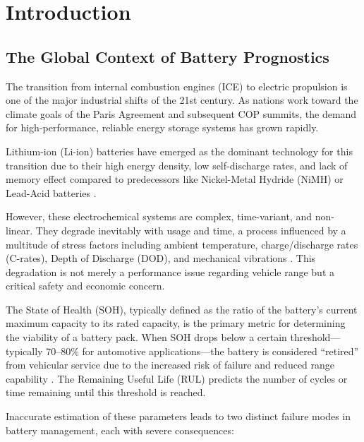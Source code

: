 \chapter{Introduction}
\label{ch:intro}

\section{The Global Context of Battery Prognostics}

The transition from internal combustion engines (ICE) to electric propulsion is one of the major industrial shifts of the 21st century. As nations work toward the climate goals of the Paris Agreement and subsequent COP summits, the demand for high-performance, reliable energy storage systems has grown rapidly.

Lithium-ion (Li-ion) batteries have emerged as the dominant technology for this transition due to their high energy density, low self-discharge rates, and lack of memory effect compared to predecessors like Nickel-Metal Hydride (NiMH) or Lead-Acid batteries \cite{ref1_general}.

However, these electrochemical systems are complex, time-variant, and non-linear. They degrade inevitably with usage and time, a process influenced by a multitude of stress factors including ambient temperature, charge/discharge rates (C-rates), Depth of Discharge (DOD), and mechanical vibrations \cite{nasa_datasets}. This degradation is not merely a performance issue regarding vehicle range but a critical safety and economic concern.

The State of Health (SOH), typically defined as the ratio of the battery's current maximum capacity to its rated capacity, is the primary metric for determining the viability of a battery pack. When SOH drops below a certain threshold—typically 70--80\% for automotive applications—the battery is considered ``retired'' from vehicular service due to the increased risk of failure and reduced range capability \cite{ma_dual_exp}. The Remaining Useful Life (RUL) predicts the number of cycles or time remaining until this threshold is reached.

Inaccurate estimation of these parameters leads to two distinct failure modes in battery management, each with severe consequences:

